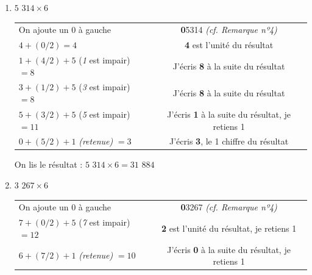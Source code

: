 \documentclass[a4paper, twoside]{article}
\begin{document}
		\begin{small}
		\begin{enumerate}

			\item $5$ $314 \times 6$
			
			\begin{tabular}{l|c}

				On ajoute un 0 à gauche & \textbf{0}5314 \textit{(cf. Remarque nº4)}
				
				\tabularnewline		
				
				$4 + (0/2) = 4$ & \textbf{4} est l'unité du résultat
				
				\tabularnewline
				
				$1 + (4/2) + 5$ (\textit{1} est impair) $= 8$ & J'écris \textbf{8} à la suite du résultat
				
				\tabularnewline
				
				
				$3 + (1/2) + 5$ (\textit{3} est impair) $= 8$ & J'écris \textbf{8} à la suite du résultat
				
				\tabularnewline
				
				
				$5 + (3/2) + 5$ (\textit{5} est impair) $= 11$ & J'écris \textbf{1} à la suite du résultat, je retiens 1
				
				\tabularnewline
				
				$0 + (5/2) + 1$ \textit{(retenue)} $= 3$ & J'écris \textbf{3}, le 1\up{er} chiffre du résultat
				
			\end{tabular}
			
			On lis le résultat : {\boldmath $5$ $314 \times 6 = 31$ $884$}\\





			\item $3$ $267 \times 6$
			
			\begin{tabular}{l|c}

				On ajoute un 0 à gauche & \textbf{0}3267 \textit{(cf. Remarque nº4)}
				
				\tabularnewline
				
				$7 + (0/2) + 5$ (\textit{7} est impair) $= 12$ & \textbf{2} est l'unité du résultat, je retiens 1
						
				\tabularnewline
				
				$6 + (7/2) + 1$ \textit{(retenue)} $= 10$ & J'écris \textbf{0} à la suite du résultat, je retiens 1
				

\end{tabular}
\end{enumerate}
\end{small}
\end{document}

